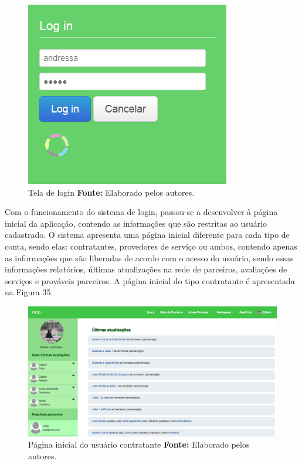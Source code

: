 \begin{figure}[h!]
	\centerline{\includegraphics[scale=0.60]{./imagens/login.jpg}}
	\caption[Tela de login ]
	{Tela de login \textbf{Fonte:} Elaborado pelos autores.}
	\label{fig:exemplo1}
\end{figure}

\par Com o funcionamento do sistema de login, passou-se a desenvolver à página inicial da aplicação, contendo as informações que são restritas ao usuário cadastrado. O sistema apresenta uma página inicial diferente para cada tipo de conta, sendo elas: contratantes, provedores de serviço ou ambos, contendo apenas as informações que são liberadas de acordo com o acesso do usuário, sendo essas informações relatórios, últimas atualizações na rede de parceiros, avaliações de serviços e prováveis parceiros. A página inicial do tipo contratante é apresentada na Figura 35.

\begin{figure}[h!]
	\centerline{\includegraphics[scale=0.35]{./imagens/home-contratante.png}}
	\caption[Página inicial do usuário contratante]
	{Página inicial do usuário contratante \textbf{Fonte:} Elaborado pelos autores.}
	\label{fig:exemplo1}
\end{figure}


